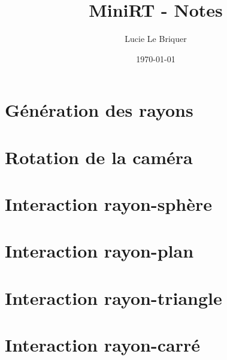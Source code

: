 

\title{\LARGE \textbf{MiniRT} - Notes}
\author{\large Lucie Le Briquer}
\date{\today}


\maketitle
\tableofcontents
\newpage
\section{Génération des rayons}
\newpage
\section{Rotation de la caméra}
\newpage
\section{Interaction rayon-sphère}
\newpage
\section{Interaction rayon-plan}
\newpage
\section{Interaction rayon-triangle}
\newpage
\section{Interaction rayon-carré}
\newpage
